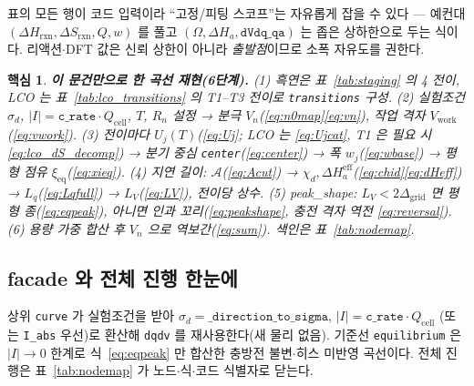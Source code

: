 \documentclass[11pt,a4paper]{article}
\newtheorem*{keybox}{핵심}
\newcommand{\eff}{\mathrm{eff}}
\newcommand{\eq}{\mathrm{eq}}
\newcommand{\cell}{\mathrm{cell}}
\newcommand{\rxn}{\mathrm{rxn}}
\newcommand{\work}{\mathrm{work}}
\newcommand{\code}[1]{\texttt{#1}}
\begin{document}
표의 모든 행이 코드 입력이라 ``고정/피팅 스코프''는 자유롭게 잡을 수 있다 — 예컨대 $(\Delta H_\rxn,\Delta S_\rxn,Q,w)$ 를
풀고 $(\Omega,\Delta H_a,\code{dVdq\_qa})$ 는 좁은 상하한으로 두는 식이다. 리액션$\cdot$DFT 값은 신뢰 상한이 아니라
\emph{출발점}이므로 소폭 자유도를 권한다.

\begin{keybox}
\textbf{이 문건만으로 한 곡선 재현(6단계).}
(1) 흑연은 표~\ref{tab:staging} 의 4 전이, LCO 는 표~\ref{tab:lco_transitions} 의 T1--T3 전이로
\code{transitions} 구성.
(2) 실험조건 $\sigma_d$, $|I|=\code{c\_rate}\cdot Q_\cell$, $T$, $R_n$ 설정 → 분극 $V_n$(\eqref{eq:n0map}\eqref{eq:vn}), 작업 격자 $V_\work$(\eqref{eq:vwork}).
(3) 전이마다 $U_j(T)$(\eqref{eq:Uj}; LCO 는 \eqref{eq:Ujcat}, T1 은 필요 시 \eqref{eq:lco_dS_decomp})
→ 분기 중심 \code{center}(\eqref{eq:center}) → 폭 $w_j$(\eqref{eq:wbase}) → 평형 점유 $\xi_\eq$(\eqref{eq:xieq}).
(4) 지연 길이: $\mathcal A$(\eqref{eq:Acut}) → $\chi_d,\Delta H_a^\eff$(\eqref{eq:chid}\eqref{eq:dHeff}) → $L_q$(\eqref{eq:Lqfull}) → $L_V$(\eqref{eq:LV}), 전이당 상수.
(5) peak\_shape: $L_V<2\Delta_\mathrm{grid}$ 면 평형 종(\eqref{eq:eqpeak}), 아니면 인과 꼬리(\eqref{eq:peakshape}, 충전 격자 역전 \eqref{eq:reversal}).
(6) 용량 가중 합산 후 $V_n$ 으로 역보간(\eqref{eq:sum}). 색인은 표~\ref{tab:nodemap}.
\end{keybox}

\subsection{facade 와 전체 진행 한눈에}
상위 \code{curve} 가 실험조건을 받아 $\sigma_d=\code{\_direction\_to\_sigma}$, $|I|=\code{c\_rate}\cdot Q_\cell$
(또는 \code{I\_abs} 우선)로 환산해 \code{dqdv} 를 재사용한다(새 물리 없음). 기준선 \code{equilibrium} 은
$|I|\to0$ 한계로 식~\eqref{eq:eqpeak} 만 합산한 충방전 불변$\cdot$히스 미반영 곡선이다. 전체 진행은 표~\ref{tab:nodemap}
가 노드$\cdot$식$\cdot$코드 식별자로 닫는다.
\end{document}
